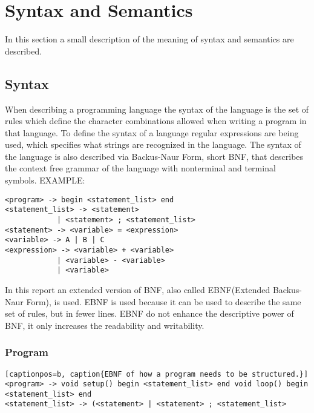 \section{Syntax and Semantics}\label{analysis:syntax-and-semantics}
In this section a small description of the meaning of syntax and semantics are described.

\subsection{Syntax}
When describing a programming language the syntax of the language is the set of rules which define the character combinations allowed when writing a program in that language. To define the syntax of a language regular expressions are being used, which specifies what strings are recognized in the language. The syntax of the language is also described via Backus-Naur Form, short BNF, that describes the context free grammar of the language with nonterminal and terminal symbols.
EXAMPLE: \\
\begin{lstlisting}
<program> -> begin <statement_list> end
<statement_list> -> <statement>
			| <statement> ; <statement_list>
<statement> -> <variable> = <expression>
<variable> -> A | B | C
<expression> -> <variable> + <variable>
			| <variable> - <variable>
			| <variable>
\end{lstlisting}

In this report an extended version of BNF, also called EBNF(Extended Backus-Naur Form), is used. EBNF is used because it can be used to describe the same set of rules, but in fewer lines. EBNF  do not enhance the descriptive power of BNF, it only increases the readability and writability.

\subsubsection*{Program}
\begin{lstlisting}[captionpos=b, caption{EBNF of how a program needs to be structured.}]
<program> -> void setup() begin <statement_list> end void loop() begin <statement_list> end
<statement_list> -> (<statement> | <statement> ; <statement_list>
\end{lstlisting}

